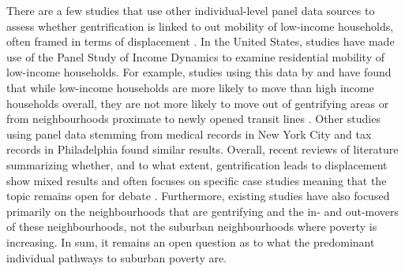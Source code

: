There are a few studies that use other individual-level panel data sources to assess whether gentrification is linked to out mobility of low-income households, often framed in terms of displacement \cite{zuk_gentrification_2018}. In the United States, studies have made use of the Panel Study of Income Dynamics to examine residential mobility of low-income households. For example, studies using this data by  and  have found that while low-income households are more likely to move than high income households overall, they are not more likely to move out of gentrifying areas \cite{freeman_displacement_2005} or from neighbourhoods proximate to newly opened transit lines \cite{delmelle_new_2020}. Other studies using panel data stemming from medical records in New York City \cite{dragan_does_2019} and tax records in Philadelphia \cite{ding_gentrification_2016} found similar results. Overall, recent reviews of literature summarizing whether, and to what extent, gentrification leads to displacement show mixed results and often focuses on specific case studies meaning that the topic remains open for debate \cite{rayle_investigating_2015,zuk_gentrification_2018, padeiro_transit-oriented_2019}. Furthermore, existing studies have also focused primarily on the neighbourhoods that are gentrifying and the in- and out-movers of these neighbourhoods, not the suburban neighbourhoods where poverty is increasing. In sum, it remains an open question as to what the predominant individual pathways to suburban poverty are. 


